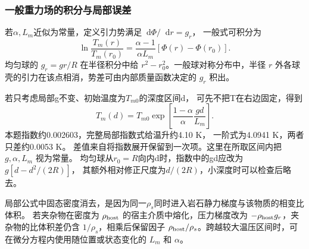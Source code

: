 \documentclass[UTF8,fontset=fandol,a4paper,11pt]{ctexart}
\newcommand{\dd}{\mathop{}\!\mathrm{d}}
\begin{document}
\subsubsection*{一般重力场的积分与局部误差}
若$\alpha,L_m$近似为常量，定义引力势满足$\dd\Phi/\dd r=g_r$，
一般式可积分为
\[
\ln\frac{T_m(r)}{T_m(r_0)}
=\frac{\alpha-1}{\alpha L_m}[\Phi(r)-\Phi(r_0)].
\]
均匀球的 $g_r=gr/R$ 在半径积分中给 $r^2-r_0^2$。一般球对称分布中，半径 $r$ 外各球壳的引力在该点相消，势差可由内部质量函数决定的 $g_r$ 积出。

若只考虑局部g不变、初始温度为$T_{m0}$的深度区间d，
可先不把T在右边固定，得到
\[
T_m(d)=T_{m0}\exp\left[\frac{1-\alpha}{\alpha}\frac{gd}{L_m}\right].
\]
本题指数约0.002603，完整局部指数式给温升约4.10 K，
一阶式为4.0941 K，两者只差约0.0053 K。
差值来自将指数展开保留到一次项。这里在所取区间内把 $g,\alpha,L_m$ 视为常量。
均匀球从$r_0=R$向内d时，指数中的gd应改为$g[d-d^2/(2R)]$，
其额外相对修正尺度为$d/(2R)$，小深度时可以检查后略去。

局部公式中固态密度消去，是因为同一$\rho_s$同时进入岩石静力梯度与该物质的相变比体积。
若夹杂物在密度为 $\rho_{\rm host}$ 的宿主介质中熔化，压力梯度改为 $-\rho_{\rm host}g_r$，夹杂物的比体积差仍含 $1/\rho_s$，相乘后保留因子 $\rho_{\rm host}/\rho_s$。跨越较大温压区间时，可在微分方程内使用随位置或状态变化的 $L_m$ 和 $\alpha$。
\end{document}
